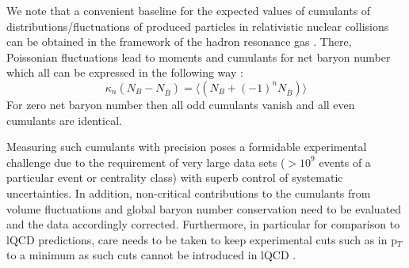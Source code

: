 We note that a convenient baseline for the expected values of cumulants of distributions/fluctuations of produced particles in relativistic nuclear collisions can be obtained in the framework of the hadron re\-so\-nance gas \cite{Allton:2005gk,Karsch:2010ck,BraunMunzinger:2011ta,Borsanyi:2018grb,Luo:2017faz}. There, Poissonian fluctuations lead to moments and cumulants for net baryon number which all can be expressed in the following way \cite{BraunMunzinger:2011ta,BraunMunzinger:2011dn, Braun-Munzinger:2018yru}:
\begin{equation}
\label{lbaseline}
\kappa_n(N_B - N_{\bar B}) = \langle (N_B +(-1)^n N_{\bar{B}}) \rangle
\end{equation}
For zero net baryon number then all odd cumulants vanish and all even cumulants are identical.

Measuring such cumulants with precision poses a formidable experimental challenge due to the requirement of very large data sets ($> 10^9$ events of a particular event or centrality class) with superb control of systematic uncertainties. In addition, non-critical contributions to the cumulants from volume fluctuations and global baryon number conservation \cite{Skokov:2012ds,Braun-Munzinger:2016yjz, Braun-Munzinger:2018yru} need to be evaluated and the data accordingly corrected. Furthermore, in particular for comparison to lQCD predictions, care needs to be taken to keep experimental cuts such as in p$_T$ to a minimum as such cuts cannot be introduced in lQCD \cite{Karsch:2015zna,Alba:2015iva}.
     
